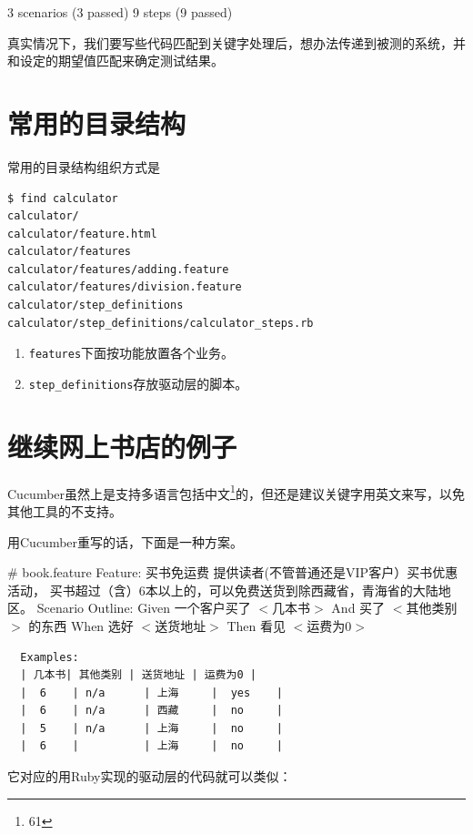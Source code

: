 3 scenarios (3 passed)
 9 steps (9 passed)

真实情况下，我们要写些代码匹配到关键字处理后，想办法传递到被测的系统，并和设定的期望值匹配来确定测试结果。

\section{常用的目录结构}
\label{常用的目录结构}

常用的目录结构组织方式是

\begin{lstlisting}[language=bash]
$ find calculator
calculator/
calculator/feature.html
calculator/features
calculator/features/adding.feature
calculator/features/division.feature
calculator/step_definitions
calculator/step_definitions/calculator_steps.rb
\end{lstlisting}

\begin{enumerate}
\item \texttt{features}下面按功能放置各个业务。

\item \texttt{step\_definitions}存放驱动层的脚本。

\end{enumerate}

\section{继续网上书店的例子}
\label{继续网上书店的例子}

Cucumber虽然上是支持多语言包括中文\footnote{61}的，但还是建议关键字用英文来写，以免其他工具的不支持。

用Cucumber重写的话，下面是一种方案。

\# book.feature
 Feature: 买书免运费
 提供读者(不管普通还是VIP客户）买书优惠活动，
 买书超过（含）6本以上的，可以免费送货到除西藏省，青海省的大陆地区。
 Scenario Outline:
 Given 一个客户买了 $<$几本书$>$
 And 买了 $<$其他类别$>$ 的东西
 When 选好 $<$送货地址$>$
 Then 看见 $<$运费为0$>$

\begin{verbatim}
  Examples:
  | 几本书| 其他类别 | 送货地址 | 运费为0 |
  |  6    | n/a      | 上海     |  yes    |
  |  6    | n/a      | 西藏     |  no     |
  |  5    | n/a      | 上海     |  no     |
  |  6    |          | 上海     |  no     |
\end{verbatim}

它对应的用Ruby实现的驱动层的代码就可以类似：

